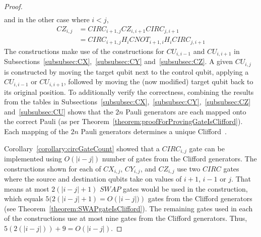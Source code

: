 \begin{proof}
\begin{align}
\end{align}
and in the other case where $i < j$,
\begin{align}
\mathit{CZ}_{i,j} &= \mathit{CIRC}_{i+1,j}\mathit{CZ}_{i,i+1}\mathit{CIRC}_{j,i+1}\\
&= \mathit{CIRC}_{i+1,j}H_{i}\mathit{CNOT}_{i+1,i}H_{i}\mathit{CIRC}_{j,i+1}
\end{align}
The constructions make use of the constructions for $\mathit{CU}_{i,i-1}$ and $\mathit{CU}_{i,i+1}$ in Subsections~\ref{subsubsec:CX},~\ref{subsubsec:CY} and~\ref{subsubsec:CZ}. A given $\mathit{CU}_{i,j}$ is constructed by moving the target qubit next to the control qubit, applying a $\mathit{CU}_{i,i-1}$ or $\mathit{CU}_{i,i+1}$, followed by moving the (now modified) target qubit back to its original position. To additionally verify the correctness, combining the results from the tables in Subsections~\ref{subsubsec:CX},~\ref{subsubsec:CY},~\ref{subsubsec:CZ} and~\ref{subsubsec:CU} shows that the $2n$ Pauli generators are each mapped onto the correct Pauli (as per Theorem~\ref{theorem:proofForProvingGateIsClifford}). Each mapping of the $2n$ Pauli generators determines a unique Clifford~\cite{ozols2008clifford}.

Corollary~\ref{corollary:circGateCount} showed that a $\mathit{CIRC}_{i,j}$ gate can be implemented using $O \left(\lvert i - j \rvert \right)$ number of gates from the Clifford generators. The constructions shown for each of $\mathit{CX}_{i,j}$, $\mathit{CY}_{i,j}$, and $\mathit{CZ}_{i,j}$ use two $\mathit{CIRC}$ gates where the source and destination qubits take on values of $i+1$, $i-1$ or $j$. That means at most $2(\lvert i - j \rvert + 1)$ $\mathit{SWAP}$ gates would be used in the construction, which equals $5(2(\lvert i - j \rvert + 1) = O \left(\lvert i - j \rvert) \right)$ gates from the Clifford generators (see Theorem~\ref{theorem:SWAPgateIsClifford}). The remaining gates used in each of the constructions use at most nine gates from the Clifford generators. Thus, $5(2(\lvert i - j \rvert)) + 9 = O\left(\lvert i - j \rvert \right)$.
\end{proof}

